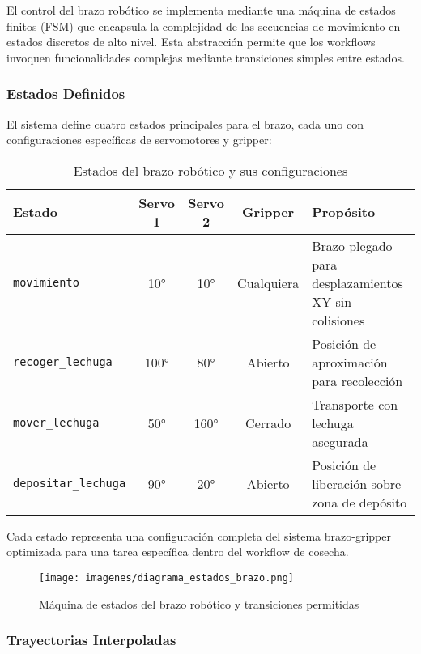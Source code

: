 El control del brazo robótico se implementa mediante una máquina de estados finitos (FSM) que encapsula la complejidad de las secuencias de movimiento en estados discretos de alto nivel. Esta abstracción permite que los workflows invoquen funcionalidades complejas mediante transiciones simples entre estados.

\subsubsection{Estados Definidos}

El sistema define cuatro estados principales para el brazo, cada uno con configuraciones específicas de servomotores y gripper:

\begin{table}[H]
\centering
\caption{Estados del brazo robótico y sus configuraciones}
\label{tab:estados_brazo}
\begin{tabular}{|l|c|c|c|p{5cm}|}
\hline
\textbf{Estado} & \textbf{Servo 1} & \textbf{Servo 2} & \textbf{Gripper} & \textbf{Propósito} \\
\hline
\texttt{movimiento} & 10° & 10° & Cualquiera & Brazo plegado para desplazamientos XY sin colisiones \\
\hline
\texttt{recoger\_lechuga} & 100° & 80° & Abierto & Posición de aproximación para recolección \\
\hline
\texttt{mover\_lechuga} & 50° & 160° & Cerrado & Transporte con lechuga asegurada \\
\hline
\texttt{depositar\_lechuga} & 90° & 20° & Abierto & Posición de liberación sobre zona de depósito \\
\hline
\end{tabular}
\end{table}

Cada estado representa una configuración completa del sistema brazo-gripper optimizada para una tarea específica dentro del workflow de cosecha.

\begin{figure}[H]
    \centering
    \texttt{[image: imagenes/diagrama\_estados\_brazo.png]}
    \caption{Máquina de estados del brazo robótico y transiciones permitidas}
    \label{fig:estados_brazo}
\end{figure}

\subsubsection{Trayectorias Interpoladas}

